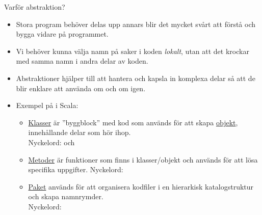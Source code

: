 \begin{Slide}{Varför abstraktion?}
\begin{itemize}
\item Stora program behöver delas upp annars blir det mycket svårt att förstå och bygga vidare på programmet.
\item Vi behöver kunna välja namn på saker i koden \textit{lokalt}, utan att det krockar med samma namn i andra delar av koden.
\item Abstraktioner hjälper till att hantera och kapsla in komplexa delar så att de blir enklare att använda om och om igen.

\item Exempel på  i Scala:
\begin{itemize}

\item \href{https://sv.wikipedia.org/wiki/Klass_\%28programmering\%29}{Klasser} är ''byggblock'' med kod som används för att skapa \href{https://sv.wikipedia.org/wiki/Objektorienterad_programmering\#Objekt}{objekt}, innehållande delar som hör ihop. \\ Nyckelord:  och 

\item \href{https://en.wikipedia.org/wiki/Method_\%28computer_programming\%29}{Metoder} är funktioner som finns i klasser/objekt och används för att lösa specifika uppgifter.  Nyckelord: 

\item \href{https://en.wikipedia.org/wiki/Java_package}{Paket} används för att organisera kodfiler i en hierarkisk katalogstruktur och skapa namnrymder. \\Nyckelord: 

\end{itemize}

\end{itemize}
\end{Slide}





